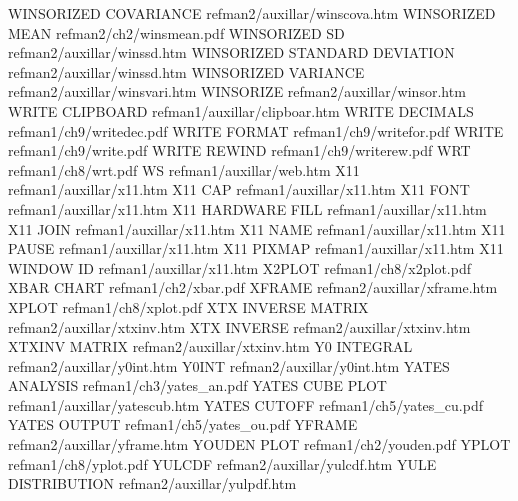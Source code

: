 WINSORIZED COVARIANCE                   refman2/auxillar/winscova.htm
WINSORIZED MEAN                         refman2/ch2/winsmean.pdf
WINSORIZED SD                           refman2/auxillar/winssd.htm
WINSORIZED STANDARD DEVIATION           refman2/auxillar/winssd.htm
WINSORIZED VARIANCE                     refman2/auxillar/winsvari.htm
WINSORIZE                               refman2/auxillar/winsor.htm
WRITE CLIPBOARD                         refman1/auxillar/clipboar.htm
WRITE DECIMALS                          refman1/ch9/writedec.pdf
WRITE FORMAT                            refman1/ch9/writefor.pdf
WRITE                                   refman1/ch9/write.pdf
WRITE REWIND                            refman1/ch9/writerew.pdf
WRT                                     refman1/ch8/wrt.pdf
WS                                      refman1/auxillar/web.htm
X11                                     refman1/auxillar/x11.htm
X11 CAP                                 refman1/auxillar/x11.htm
X11 FONT                                refman1/auxillar/x11.htm
X11 HARDWARE FILL                       refman1/auxillar/x11.htm
X11 JOIN                                refman1/auxillar/x11.htm
X11 NAME                                refman1/auxillar/x11.htm
X11 PAUSE                               refman1/auxillar/x11.htm
X11 PIXMAP                              refman1/auxillar/x11.htm
X11 WINDOW ID                           refman1/auxillar/x11.htm
X2PLOT                                  refman1/ch8/x2plot.pdf
XBAR CHART                              refman1/ch2/xbar.pdf
XFRAME                                  refman2/auxillar/xframe.htm
XPLOT                                   refman1/ch8/xplot.pdf
XTX INVERSE MATRIX                      refman2/auxillar/xtxinv.htm
XTX INVERSE                             refman2/auxillar/xtxinv.htm
XTXINV MATRIX                           refman2/auxillar/xtxinv.htm
Y0 INTEGRAL                             refman2/auxillar/y0int.htm
Y0INT                                   refman2/auxillar/y0int.htm
YATES ANALYSIS                          refman1/ch3/yates_an.pdf
YATES CUBE PLOT                         refman1/auxillar/yatescub.htm
YATES CUTOFF                            refman1/ch5/yates_cu.pdf
YATES OUTPUT                            refman1/ch5/yates_ou.pdf
YFRAME                                  refman2/auxillar/yframe.htm
YOUDEN PLOT                             refman1/ch2/youden.pdf
YPLOT                                   refman1/ch8/yplot.pdf
YULCDF                                  refman2/auxillar/yulcdf.htm
YULE DISTRIBUTION                       refman2/auxillar/yulpdf.htm
